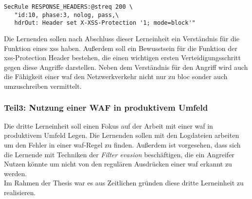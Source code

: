 \begin{verbatim}
SecRule RESPONSE_HEADERS:@streq 200 \
   "id:10, phase:3, nolog, pass,\
   hdrOut: Header set X-XSS-Protection '1; mode=block'"
\end{verbatim}

Die Lernenden sollen nach Abschluss dieser Lerneinheit ein Verständnis für die Funktion eines \ac{xss} haben.
Außerdem soll ein Bewusstsein für die Funktion der \ac{xss}-Protection Header bestehen, die einen wichtigen ersten Verteidigungsschritt gegen diese Angriffe darstellen.
Neben dem Verständnis für den Angriff wird auch die Fähigkeit einer \ac{waf} den Netzwerkverkehr nicht nur zu bloc sonder auch umzuschreiben vermittelt.

\subsubsection{Teil3: Nutzung einer WAF in produktivem Umfeld}
\label{sec:learning-unit-3-meta}

Die dritte Lerneinheit soll einen Fokus auf der Arbeit mit einer \ac{waf} in produktivem Umfeld Legen.
Die Lernenden sollen mit den Logdateien arbeiten um den Fehler in einer \ac{waf}-Regel zu finden.
Außerdem ist vorgesehen, dass sich die Lernende mit Techniken der \textit{Filter evasion} beschäftigen, die ein Angreifer Nutzen könnte um nicht von den regulären Ausdrücken einer \ac{waf} erkannt zu werden.\\

Im Rahmen der Thesis war es aus Zeitlichen gründen diese dritte Lerneinheit zu realisieren.
